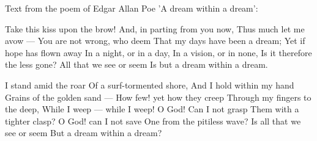Text from the poem of Edgar Allan Poe 'A dream within a dream':

Take this kiss upon the brow!
And, in parting from you now,
Thus much let me avow —
You are not wrong, who deem
That my days have been a dream;
Yet if hope has flown away
In a night, or in a day,
In a vision, or in none,
Is it therefore the less gone?
All that we see or seem
Is but a dream within a dream.

I stand amid the roar
Of a surf-tormented shore,
And I hold within my hand
Grains of the golden sand —
How few! yet how they creep
Through my fingers to the deep,
While I weep — while I weep!
O God! Can I not grasp
Them with a tighter clasp?
O God! can I not save
One from the pitiless wave?
Is all that we see or seem
But a dream within a dream?